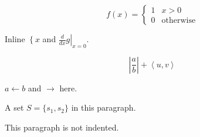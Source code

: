 \documentclass{article}
\begin{document}
\begin{equation*}
f(x) = \left\{
\begin{array}{ll}
1 & x > 0 \\
0 & \text{otherwise}
\end{array}
\right.
\end{equation*}

Inline $\left\{ x \right.$ and $\left. \frac{d}{dx} g \right|_{x=0}$.

\begin{equation*}
\left|
\frac{a}{b}
\right|
+ \left\langle u,
v \right\rangle
\end{equation*}

$a \leftarrow b$ and $\rightarrow$ here.

A set $S = \{s_1,
s_2\}$ in this paragraph.

This paragraph is not indented.
\end{document}
